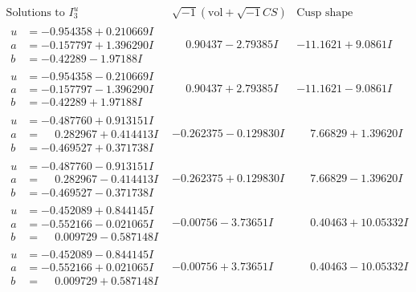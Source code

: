 \documentclass[1p]{elsarticle_modified}
\theoremstyle{definition}
\newcommand{\I}{\sqrt{-1}}
\begin{document}
$$\begin{array}{c|c|c}  
\text{Solutions to }I^u_{3}& \I (\text{vol} + \sqrt{-1}CS) & \text{Cusp shape}\\
 \hline 
\begin{aligned}
u &= -0.954358 + 0.210669 I \\
a &= -0.157797 + 1.396290 I \\
b &= -0.42289 - 1.97188 I\end{aligned}
 & \phantom{-}0.90437 - 2.79385 I & -11.1621 + 9.0861 I \\ \hline\begin{aligned}
u &= -0.954358 - 0.210669 I \\
a &= -0.157797 - 1.396290 I \\
b &= -0.42289 + 1.97188 I\end{aligned}
 & \phantom{-}0.90437 + 2.79385 I & -11.1621 - 9.0861 I \\ \hline\begin{aligned}
u &= -0.487760 + 0.913151 I \\
a &= \phantom{-}0.282967 + 0.414413 I \\
b &= -0.469527 + 0.371738 I\end{aligned}
 & -0.262375 - 0.129830 I & \phantom{-}7.66829 + 1.39620 I \\ \hline\begin{aligned}
u &= -0.487760 - 0.913151 I \\
a &= \phantom{-}0.282967 - 0.414413 I \\
b &= -0.469527 - 0.371738 I\end{aligned}
 & -0.262375 + 0.129830 I & \phantom{-}7.66829 - 1.39620 I \\ \hline\begin{aligned}
u &= -0.452089 + 0.844145 I \\
a &= -0.552166 - 0.021065 I \\
b &= \phantom{-}0.009729 - 0.587148 I\end{aligned}
 & -0.00756 - 3.73651 I & \phantom{-}0.40463 + 10.05332 I \\ \hline\begin{aligned}
u &= -0.452089 - 0.844145 I \\
a &= -0.552166 + 0.021065 I \\
b &= \phantom{-}0.009729 + 0.587148 I\end{aligned}
 & -0.00756 + 3.73651 I & \phantom{-}0.40463 - 10.05332 I \\ \hline\begin{aligned}

\end{aligned}
\end{array}$$
\end{document}
